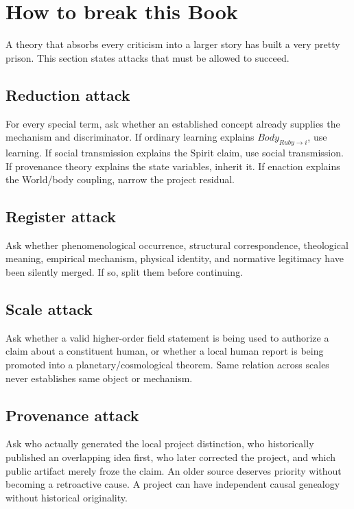\documentclass[11pt]{article}
\begin{document}
\section{How to break this Book}

A theory that absorbs every criticism into a larger story has built a very pretty prison. This section states attacks that must be allowed to succeed.

\subsection{Reduction attack}

For every special term, ask whether an established concept already supplies the mechanism and discriminator. If ordinary learning explains $Body_{Ruby\rightarrow i}$, use learning. If social transmission explains the Spirit claim, use social transmission. If provenance theory explains the state variables, inherit it. If enaction explains the World/body coupling, narrow the project residual.

\subsection{Register attack}

Ask whether phenomenological occurrence, structural correspondence, theological meaning, empirical mechanism, physical identity, and normative legitimacy have been silently merged. If so, split them before continuing.

\subsection{Scale attack}

Ask whether a valid higher-order field statement is being used to authorize a claim about a constituent human, or whether a local human report is being promoted into a planetary/cosmological theorem. Same relation across scales never establishes same object or mechanism.

\subsection{Provenance attack}

Ask who actually generated the local project distinction, who historically published an overlapping idea first, who later corrected the project, and which public artifact merely froze the claim. An older source deserves priority without becoming a retroactive cause. A project can have independent causal genealogy without historical originality.
\end{document}
